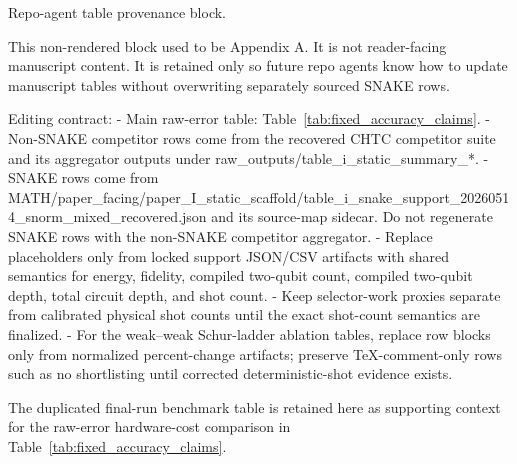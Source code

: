 \documentclass[
  reprint,
  amsmath,
  amssymb,
  aps,
  pra,
  nofootinbib,
  superscriptaddress,
  floatfix
]{revtex4-2}
\begin{document}
\clearpage
\appendix

\iffalse
Repo-agent table provenance block.

This non-rendered block used to be Appendix A. It is not reader-facing
manuscript content. It is retained only so future repo agents know how to
update manuscript tables without overwriting separately sourced SNAKE rows.

Editing contract:
- Main raw-error table: Table~\ref{tab:fixed_accuracy_claims}.
- Non-SNAKE competitor rows come from the recovered CHTC competitor suite and
  its aggregator outputs under raw_outputs/table_i_static_summary_*.
- SNAKE rows come from
  MATH/paper_facing/paper_I_static_scaffold/table_i_snake_support_20260514_snorm_mixed_recovered.json
  and its source-map sidecar. Do not regenerate SNAKE rows with the non-SNAKE
  competitor aggregator.
- Replace placeholders only from locked support JSON/CSV artifacts with shared
  semantics for energy, fidelity, compiled two-qubit count, compiled two-qubit
  depth, total circuit depth, and shot count.
- Keep selector-work proxies separate from calibrated physical shot counts
  until the exact shot-count semantics are finalized.
- For the weak--weak Schur-ladder ablation tables, replace row blocks only
  from normalized percent-change artifacts; preserve TeX-comment-only rows
  such as no shortlisting until corrected deterministic-shot evidence exists.

The duplicated final-run benchmark table is retained here as supporting context for the raw-error hardware-cost comparison in Table~\ref{tab:fixed_accuracy_claims}.
\end{document}
